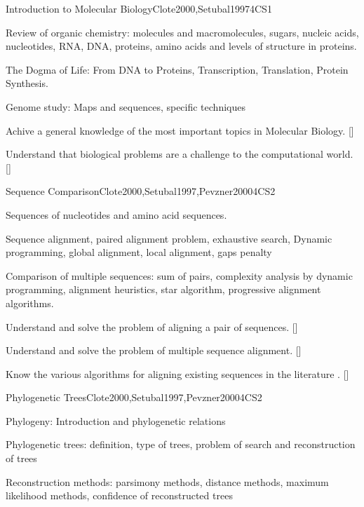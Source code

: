 \begin{syllabus}
\begin{unit}{Introduction to Molecular Biology}{}{Clote2000,Setubal1997}{4}{CS1}
\begin{topics}
\item Review of organic chemistry: molecules and macromolecules, sugars, nucleic acids, nucleotides, RNA, DNA, proteins, amino acids and levels of structure in proteins.
\item The Dogma of Life: From DNA to Proteins, Transcription, Translation, Protein Synthesis.
\item Genome study: Maps and sequences, specific techniques
\end{topics}
   \begin{learningoutcomes}
      \item  Achive  a general knowledge of the most important topics in Molecular Biology. [\Familiarity]
	  \item Understand that biological problems are a challenge to the computational world. [\Assessment]
   \end{learningoutcomes}
\end{unit}

\begin{unit}{Sequence Comparison}{}{Clote2000,Setubal1997,Pevzner2000}{4}{CS2}
\begin{topics}
\item Sequences of nucleotides and amino acid sequences.
\item Sequence alignment, paired alignment problem, exhaustive search, Dynamic programming, global alignment, local alignment, gaps penalty
\item Comparison of multiple sequences: sum of pairs, complexity analysis by dynamic programming, alignment heuristics, star algorithm, progressive alignment algorithms.
\end{topics}
\begin{learningoutcomes}
\item  Understand and solve the problem of aligning a pair of sequences. [\Usage]
\item  Understand and solve the problem of multiple sequence alignment. [\Usage]
\item  Know the various algorithms for aligning existing sequences in the  literature . [\Familiarity]
\end{learningoutcomes}
\end{unit}

\begin{unit}{Phylogenetic Trees}{}{Clote2000,Setubal1997,Pevzner2000}{4}{CS2}
\begin{topics}
\item Phylogeny: Introduction and phylogenetic relations
\item Phylogenetic trees: definition, type of trees, problem of search and reconstruction of trees
\item Reconstruction methods: parsimony methods, distance methods, maximum likelihood methods, confidence of reconstructed trees
\end{topics}


\end{unit}
\end{syllabus}
